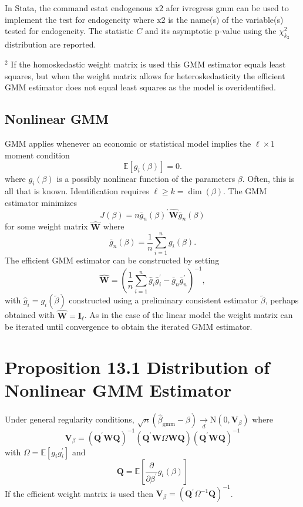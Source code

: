\documentclass[10pt]{article}
\begin{document}
In Stata, the command estat endogenous $\mathrm{x} 2$ afer ivregress gmm can be used to implement the test for endogeneity where $\mathrm{x} 2$ is the name(s) of the variable(s) tested for endogeneity. The statistic $C$ and its asymptotic $\mathrm{p}$-value using the $\chi_{k_{2}}^{2}$ distribution are reported.

${ }^{2}$ If the homoskedastic weight matrix is used this GMM estimator equals least squares, but when the weight matrix allows for heteroskedasticity the efficient GMM estimator does not equal least squares as the model is overidentified.

\subsection{Nonlinear GMM}
GMM applies whenever an economic or statistical model implies the $\ell \times 1$ moment condition
$$
\mathbb{E}\left[g_{i}(\beta)\right]=0 .
$$
where $g_{i}(\beta)$ is a possibly nonlinear function of the parameters $\beta$. Often, this is all that is known. Identification requires $\ell \geq k=\operatorname{dim}(\beta)$. The GMM estimator minimizes
$$
J(\beta)=n \bar{g}_{n}(\beta)^{\prime} \widehat{\boldsymbol{W}} \bar{g}_{n}(\beta)
$$
for some weight matrix $\widehat{\boldsymbol{W}}$ where
$$
\bar{g}_{n}(\beta)=\frac{1}{n} \sum_{i=1}^{n} g_{i}(\beta) .
$$
The efficient GMM estimator can be constructed by setting
$$
\widehat{\boldsymbol{W}}=\left(\frac{1}{n} \sum_{i=1}^{n} \widehat{g}_{i} \widehat{g}_{i}^{\prime}-\bar{g}_{n} \bar{g}_{n}^{\prime}\right)^{-1},
$$
with $\widehat{g}_{i}=g_{i}(\widetilde{\beta})$ constructed using a preliminary consistent estimator $\widetilde{\beta}$, perhaps obtained with $\widehat{\boldsymbol{W}}=\boldsymbol{I}_{\ell}$. As in the case of the linear model the weight matrix can be iterated until convergence to obtain the iterated GMM estimator.

\section{Proposition 13.1 Distribution of Nonlinear GMM Estimator}
Under general regularity conditions, $\sqrt{n}\left(\widehat{\beta}_{\mathrm{gmm}}-\beta\right) \underset{d}{\longrightarrow} \mathrm{N}\left(0, \boldsymbol{V}_{\beta}\right)$ where
$$
\boldsymbol{V}_{\beta}=\left(\boldsymbol{Q}^{\prime} \boldsymbol{W} \boldsymbol{Q}\right)^{-1}\left(\boldsymbol{Q}^{\prime} \boldsymbol{W} \Omega \boldsymbol{W} \boldsymbol{Q}\right)\left(\boldsymbol{Q}^{\prime} \boldsymbol{W} \boldsymbol{Q}\right)^{-1}
$$
with $\Omega=\mathbb{E}\left[g_{i} g_{i}^{\prime}\right]$ and
$$
\boldsymbol{Q}=\mathbb{E}\left[\frac{\partial}{\partial \beta^{\prime}} g_{i}(\beta)\right]
$$
If the efficient weight matrix is used then $\boldsymbol{V}_{\beta}=\left(\boldsymbol{Q}^{\prime} \Omega^{-1} \boldsymbol{Q}\right)^{-1}$.
\end{document}
